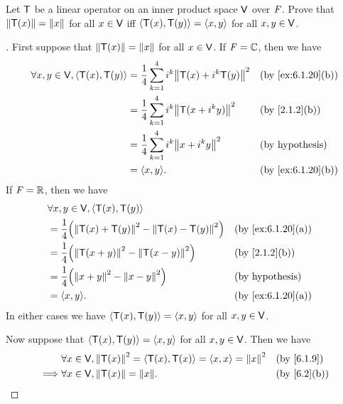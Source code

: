 \begin{ex}\label{ex:6.3.10}
  Let \(\mathsf{T}\) be a linear operator on an inner product space \(\mathsf{V}\) over \(\mathit{F}\).
  Prove that \(\left\lVert\mathsf{T}(x)\right\rVert = \left\lVert x\right\rVert\) for all \(x \in \mathsf{V}\) iff \(\left\langle\mathsf{T}(x), \mathsf{T}(y)\right\rangle = \left\langle x,y\right\rangle\) for all \(x, y \in \mathsf{V}\).
\end{ex}

\begin{proof}[]
  First suppose that \(\left\lVert\mathsf{T}(x)\right\rVert = \left\lVert x\right\rVert\) for all \(x \in \mathsf{V}\).
  If \(\mathit{F} = \mathbb{C}\), then we have
  \begin{align*}
    \forall x, y \in \V, \inn{\T(x), \T(y)} & = \frac{1}{4} \sum_{k = 1}^4 i^k \norm{\T(x) + i^k \T(y)}^2 &  & \by{ex:6.1.20}[b]      \\
                                            & = \frac{1}{4} \sum_{k = 1}^4 i^k \norm{\T(x + i^k y)}^2     &  & \by{2.1.2}[b]          \\
                                            & = \frac{1}{4} \sum_{k = 1}^4 i^k \norm{x + i^k y}^2         &  & \text{(by hypothesis)} \\
                                            & = \inn{x, y}.                                               &  & \by{ex:6.1.20}[b]
  \end{align*}
  If \(\mathit{F} = \mathbb{R}\), then we have
  \begin{align*}
     & \forall x, y \in \V, \inn{\T(x), \T(y)}                                                        \\
     & = \frac{1}{4} \pa{\norm{\T(x) + \T(y)}^2 - \norm{\T(x) - \T(y)}^2} &  & \by{ex:6.1.20}[a]      \\
     & = \frac{1}{4} \pa{\norm{\T(x + y)}^2 - \norm{\T(x - y)}^2}         &  & \by{2.1.2}[b]          \\
     & = \frac{1}{4} \pa{\norm{x + y}^2 - \norm{x - y}^2}                 &  & \text{(by hypothesis)} \\
     & = \inn{x, y}.                                                      &  & \by{ex:6.1.20}[a]
  \end{align*}
  In either cases we have \(\left\langle\mathsf{T}(x), \mathsf{T}(y)\right\rangle = \left\langle x, y\right\rangle\) for all \(x, y \in \mathsf{V}\).

  Now suppose that \(\left\langle\mathsf{T}(x), \mathsf{T}(y)\right\rangle = \left\langle x, y\right\rangle\) for all \(x, y \in \mathsf{V}\).
  Then we have
  \begin{align*}
             & \forall x \in \V, \norm{\T(x)}^2 = \inn{\T(x), \T(x)} = \inn{x, x} = \norm{x}^2 &  & \by{6.1.9}  \\
    \implies & \forall x \in \V, \norm{\T(x)} = \norm{x}.                                      &  & \by{6.2}[b]
  \end{align*}
\end{proof}

